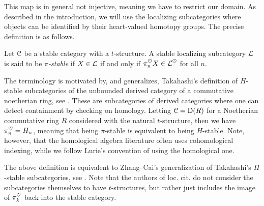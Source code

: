 This map is in general not injective, meaning we have to restrict our domain. As described in the introduction, we will use the localizing subcategories where objects can be identified by their heart-valued homotopy groups. The precise definition is as follows. 

\begin{definition}
    \label{ch4:def:pi-stable-localizing-subcategory}
    Let $\EuScript{C}$ be a stable category with a $t$-structure. A stable localizing subcategory $\mathcal{L}$ is said to be \emph{$\pi$-stable} if $X\in \mathcal{L}$ if and only if $\pi_n^\heartsuit X\in \mathcal{L}^\heartsuit$ for all $n$. 
\end{definition}

\begin{remark}
    The terminology is motivated by, and generalizes, Takahashi's definition of $H$-stable subcategories of the unbounded derived category of a commutative noetherian ring, see \cite[2.11]{takahashi_2009}. These are subcategories of derived categories where one can detect containment by checking on homology. Letting $\EuScript{C}=\mathrm{D}(R)$ for a Noetherian commutative ring $R$ considered with the natural $t$-structure, then we have $\pi_n^\heartsuit = H_n$, meaning that being $\pi$-stable is equivalent to being $H$-stable. Note, however, that the homological algebra literature often uses cohomological indexing, while we follow Lurie's convention of using the homological one. 
\end{remark}

\begin{remark}
    The above definition is equivalent to Zhang--Cai's generalization of Takahashi's $H$-stable subcategories, see \cite{zhang-cai_2017}. Note that the authors of loc. cit. do not consider the subcategories themselves to have $t$-structures, but rather just includes the image of $\pi_k^\heartsuit$ back into the stable category. 
\end{remark}

